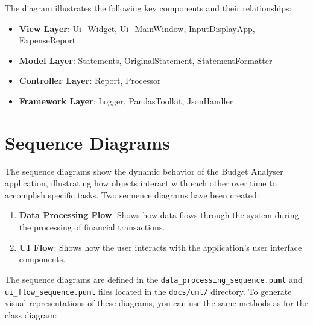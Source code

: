 \documentclass[11pt,a4paper]{report}
\begin{document}
The diagram illustrates the following key components and their relationships:
\begin{itemize}
    \item \textbf{View Layer}: Ui\_Widget, Ui\_MainWindow, InputDisplayApp, ExpenseReport
    \item \textbf{Model Layer}: Statements, OriginalStatement, StatementFormatter
    \item \textbf{Controller Layer}: Report, Processor
    \item \textbf{Framework Layer}: Logger, PandasToolkit, JsonHandler
\end{itemize}

\section{Sequence Diagrams}
The sequence diagrams show the dynamic behavior of the Budget Analyser application, illustrating how objects interact with each other over time to accomplish specific tasks. Two sequence diagrams have been created:

\begin{enumerate}
    \item \textbf{Data Processing Flow}: Shows how data flows through the system during the processing of financial transactions.
    \item \textbf{UI Flow}: Shows how the user interacts with the application's user interface components.
\end{enumerate}

The sequence diagrams are defined in the \texttt{data\_processing\_sequence.puml} and \texttt{ui\_flow\_sequence.puml} files located in the \texttt{docs/uml/} directory. To generate visual representations of these diagrams, you can use the same methods as for the class diagram:
\end{document}
